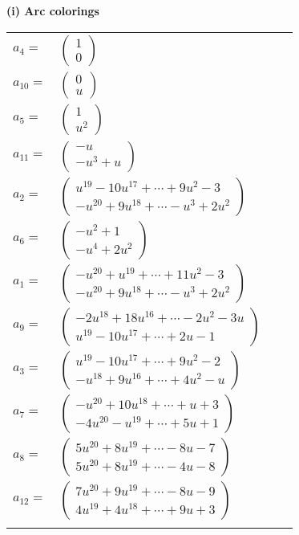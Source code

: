 \documentclass[1p]{elsarticle_modified}
\theoremstyle{definition}
\begin{document}
\flushleft \textbf{(i) Arc colorings}\\
\begin{tabular}{m{7pt} m{180pt} m{7pt} m{180pt} }
\flushright $a_{4}=$&$\begin{pmatrix}1\\0\end{pmatrix}$ \\
\flushright $a_{10}=$&$\begin{pmatrix}0\\u\end{pmatrix}$ \\
\flushright $a_{5}=$&$\begin{pmatrix}1\\u^2\end{pmatrix}$ \\
\flushright $a_{11}=$&$\begin{pmatrix}- u\\- u^3+u\end{pmatrix}$ \\
\flushright $a_{2}=$&$\begin{pmatrix}u^{19}-10 u^{17}+\cdots+9 u^2-3\\- u^{20}+9 u^{18}+\cdots- u^3+2 u^2\end{pmatrix}$ \\
\flushright $a_{6}=$&$\begin{pmatrix}- u^2+1\\- u^4+2 u^2\end{pmatrix}$ \\
\flushright $a_{1}=$&$\begin{pmatrix}- u^{20}+u^{19}+\cdots+11 u^2-3\\- u^{20}+9 u^{18}+\cdots- u^3+2 u^2\end{pmatrix}$ \\
\flushright $a_{9}=$&$\begin{pmatrix}-2 u^{18}+18 u^{16}+\cdots-2 u^2-3 u\\u^{19}-10 u^{17}+\cdots+2 u-1\end{pmatrix}$ \\
\flushright $a_{3}=$&$\begin{pmatrix}u^{19}-10 u^{17}+\cdots+9 u^2-2\\- u^{18}+9 u^{16}+\cdots+4 u^2- u\end{pmatrix}$ \\
\flushright $a_{7}=$&$\begin{pmatrix}- u^{20}+10 u^{18}+\cdots+u+3\\-4 u^{20}- u^{19}+\cdots+5 u+1\end{pmatrix}$ \\
\flushright $a_{8}=$&$\begin{pmatrix}5 u^{20}+8 u^{19}+\cdots-8 u-7\\5 u^{20}+8 u^{19}+\cdots-4 u-8\end{pmatrix}$ \\
\flushright $a_{12}=$&$\begin{pmatrix}7 u^{20}+9 u^{19}+\cdots-8 u-9\\4 u^{19}+4 u^{18}+\cdots+9 u+3\end{pmatrix}$\\&\end{tabular}
\end{document}
